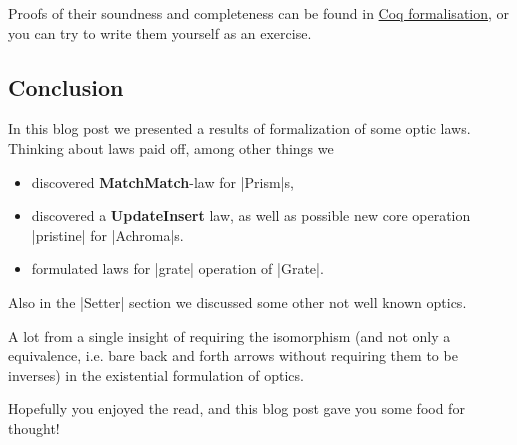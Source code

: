 \documentclass{article}
\begin{document}
Proofs of their soundness and completeness can be found in
\href{https://github.com/phadej/lens-laws}{Coq formalisation},
or you can try to write them yourself as an exercise.

\subsection{Conclusion}

In this blog post we presented a results of formalization of some
optic laws. Thinking about laws paid off, among other things we

\begin{itemize}
\item discovered \textbf{MatchMatch}-law for |Prism|s,
\item discovered a \textbf{UpdateInsert} law, as well
  as possible new core operation |pristine| for |Achroma|s.
\item formulated laws for |grate| operation of |Grate|.
\end{itemize}

Also in the |Setter| section we discussed some other not well known optics.

A lot from a single insight of requiring the isomorphism
(and not only a equivalence, i.e. bare back and forth arrows without requiring them to be inverses)
in the existential formulation of optics.

Hopefully you enjoyed the read, and this blog post gave you some food for
thought!
\end{document}
